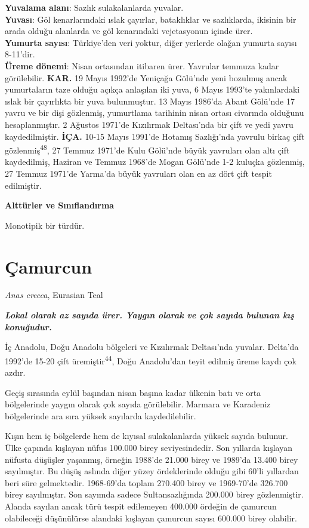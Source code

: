 \documentclass[
  letterpaper,
  DIV=11,
  numbers=noendperiod]{scrreprt}
\begin{document}
\textbf{Yuvalama alanı}: Sazlık sulakalanlarda yuvalar.\\
\textbf{Yuvası}: Göl kenarlarındaki ıslak çayırlar, bataklıklar ve
sazlıklarda, ikisinin bir arada olduğu alanlarda ve göl kenarındaki
vejetasyonun içinde ürer.\\
\textbf{Yumurta sayısı}: Türkiye'den veri yoktur, diğer yerlerde olağan
yumurta sayısı 8-11'dir.\\
\textbf{Üreme dönemi}: Nisan ortasından itibaren ürer. Yavrular temmuza
kadar görülebilir. \textbf{KAR.} 19 Mayıs 1992'de Yeniçağa Gölü'nde yeni
bozulmuş ancak yumurtaların taze olduğu açıkça anlaşılan iki yuva, 6
Mayıs 1993'te yakınlardaki ıslak bir çayırlıkta bir yuva bulunmuştur. 13
Mayıs 1986'da Abant Gölü'nde 17 yavru ve bir dişi gözlenmiş, yumurtlama
tarihinin nisan ortası civarında olduğunu hesaplanmıştır. 2 Ağustos
1971'de Kızılırmak Deltası'nda bir çift ve yedi yavru kaydedilmiştir.
\textbf{İÇA.} 10-15 Mayıs 1991'de Hotamış Sazlığı'nda yavrulu birkaç
çift gözlenmiş\textsuperscript{48}, 27 Temmuz 1971'de Kulu Gölü'nde
büyük yavruları olan altı çift kaydedilmiş, Haziran ve Temmuz 1968'de
Mogan Gölü'nde 1-2 kuluçka gözlenmiş, 27 Temmuz 1971'de Yarma'da büyük
yavruları olan en az dört çift tespit edilmiştir.

\textbf{Alttürler ve Sınıflandırma}

Monotipik bir türdür.

\section{Çamurcun}\label{uxe7amurcun}

\emph{Anas crecca}, Eurasian Teal

\textbf{\emph{Lokal olarak az sayıda ürer. Yaygın olarak ve çok sayıda
bulunan kış konuğudur.}}

İç Anadolu, Doğu Anadolu bölgeleri ve Kızılırmak Deltası'nda yuvalar.
Delta'da 1992'de 15-20 çift üremiştir\textsuperscript{44}, Doğu
Anadolu'dan teyit edilmiş üreme kaydı çok azdır.

Geçiş sırasında eylül başından nisan başına kadar ülkenin batı ve orta
bölgelerinde yaygın olarak çok sayıda görülebilir. Marmara ve Karadeniz
bölgelerinde ara sıra yüksek sayılarda kaydedilebilir.

Kışın hem iç bölgelerde hem de kıyısal sulakalanlarda yüksek sayıda
bulunur. Ülke çapında kışlayan nüfus 100.000 birey seviyesindedir. Son
yıllarda kışlayan nüfusta düşüşler yaşanmış, örneğin 1988'de 21.000
birey ve 1989'da 13.400 birey sayılmıştır. Bu düşüş aslında diğer yüzey
ördeklerinde olduğu gibi 60'li yıllardan beri süre gelmektedir.
1968-69'da toplam 270.400 birey ve 1969-70'de 326.700 birey sayılmıştır.
Son sayımda sadece Sultansazlığında 200.000 birey gözlenmiştir. Alanda
sayılan ancak türü tespit edilemeyen 400.000 ördeğin de çamurcun
olabileceği düşünülürse alandaki kışlayan çamurcun sayısı 600.000 birey
olabilir.
\end{document}
